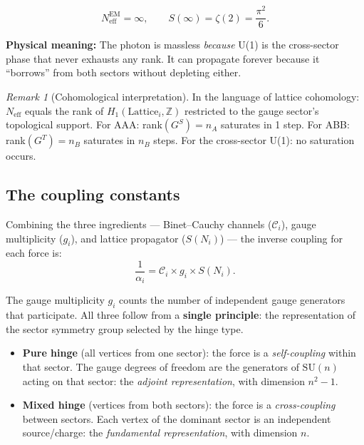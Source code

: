 \documentclass[12pt]{article}
\theoremstyle{remark}
\newtheorem{remark}[theorem]{Remark}
\theoremstyle{definition}
\begin{document}
\begin{equation}
N_\text{eff}^\text{EM} = \infty, \qquad S(\infty) = \zeta(2) = \frac{\pi^2}{6}.
\end{equation}

\textbf{Physical meaning:} The photon is massless \emph{because} U(1) is the cross-sector phase that never exhausts any rank. It can propagate forever because it ``borrows'' from both sectors without depleting either.

\bigskip

\begin{remark}[Cohomological interpretation]
In the language of lattice cohomology: $N_\text{eff}$ equals the rank of $H_1(\text{Lattice}_i, \mathbb{Z})$ restricted to the gauge sector's topological support. For AAA: rank$(G^S) = n_A$ saturates in 1 step. For ABB: rank$(G^T) = n_B$ saturates in $n_B$ steps. For the cross-sector U(1): no saturation occurs.
\end{remark}

\subsection{The coupling constants}

Combining the three ingredients --- Binet--Cauchy channels ($\mathcal{C}_i$), gauge multiplicity ($g_i$), and lattice propagator ($S(N_i)$) --- the inverse coupling for each force is:
\begin{equation}
\frac{1}{\alpha_i} = \mathcal{C}_i \times g_i \times S(N_i).
\end{equation}

The gauge multiplicity $g_i$ counts the number of independent gauge generators that participate. All three follow from a \textbf{single principle}: the representation of the sector symmetry group selected by the hinge type.

\begin{itemize}
\item \textbf{Pure hinge} (all vertices from one sector): the force is a \emph{self-coupling} within that sector. The gauge degrees of freedom are the generators of $\text{SU}(n)$ acting on that sector: the \emph{adjoint representation}, with dimension $n^2 - 1$.

\item \textbf{Mixed hinge} (vertices from both sectors): the force is a \emph{cross-coupling} between sectors. Each vertex of the dominant sector is an independent source/charge: the \emph{fundamental representation}, with dimension $n$.
\end{itemize}
\end{document}
